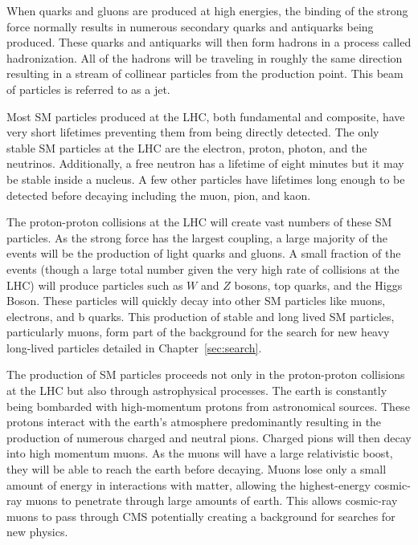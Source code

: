 When quarks and gluons are produced at high energies, the binding of the strong force normally results in numerous secondary quarks and antiquarks being produced.
These quarks and antiquarks will then form hadrons in a process called hadronization.
All of the hadrons will be traveling in roughly the same direction resulting in a stream of collinear particles from the production point.
This beam of particles is referred to as a jet.

Most SM particles produced at the LHC, both fundamental and composite, have very short lifetimes preventing them from being directly detected. The only stable SM particles
at the LHC are the electron, proton, photon, and the neutrinos. Additionally, a free neutron has a lifetime of eight minutes but it may be stable inside a nucleus.
A few other particles have lifetimes long enough to be detected before decaying including the muon, pion, and kaon.

The proton-proton collisions at the LHC will create vast numbers of these SM particles. As the strong force has the largest coupling,
a large majority of the events will be the production of light quarks and gluons. A small fraction of the events (though a large total number given the very
high rate of collisions at the LHC) will produce particles such as $W$ and $Z$ bosons, top quarks, and the Higgs Boson.
These particles will quickly decay into other SM particles like muons, electrons, and b quarks. This production of stable and long lived SM particles,
particularly muons, form part of the background for the search for new heavy long-lived particles detailed in Chapter~\ref{sec:search}.

The production of SM particles proceeds not only in the proton-proton collisions at the LHC but also through astrophysical processes.
The earth is constantly being bombarded with high-momentum protons from astronomical sources. These protons interact with the earth's atmosphere
predominantly resulting in the production of numerous charged and neutral pions. Charged pions will then decay into high momentum muons.
As the muons will have a large relativistic boost, they will be able to reach the earth before decaying.
Muons lose only a small amount of energy in interactions with matter,
allowing the highest-energy cosmic-ray muons to penetrate through large amounts of earth.
This allows cosmic-ray muons to pass through CMS potentially creating a background for searches for new physics.

